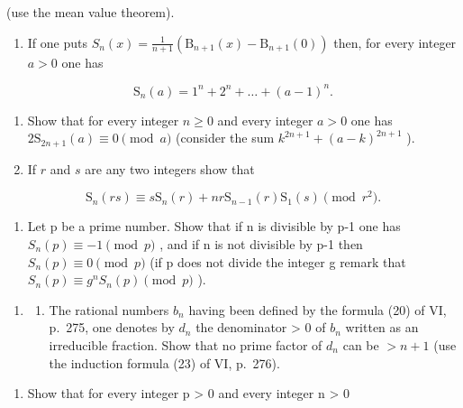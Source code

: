 (use the mean value theorem).

\begin{enumerate}
\def\labelenumi{\arabic{enumi})}
\setcounter{enumi}{4}
\tightlist
\item
  If one puts \(S_{n}(x) = \frac{1}{n + 1} (\mathrm{B}_{n + 1}(x) - \mathrm{B}_{n + 1}(0))\) then, for every integer \(a > 0\) one has
\end{enumerate}

\[
\mathrm{S} _ {n} (a) = 1 ^ {n} + 2 ^ {n} + \dots + (a - 1) ^ {n}.
\]

\begin{enumerate}
\def\labelenumi{\alph{enumi})}
\item
  Show that for every integer \(n \geqslant 0\) and every integer \(a > 0\) one has \(2\mathrm{S}_{2n + 1}(a) \equiv 0 \pmod{a}\) (consider the sum \(k^{2n + 1} + (a - k)^{2n + 1}\) ).
\item
  If \(r\) and \(s\) are any two integers show that
\end{enumerate}

\[
\mathrm{S} _ {n} (r s) \equiv s \mathrm{S} _ {n} (r) + n r \mathrm{S} _ {n - 1} (r) \mathrm{S} _ {1} (s) \pmod {r ^ {2}}.
\]

\begin{enumerate}
\def\labelenumi{\alph{enumi})}
\setcounter{enumi}{2}
\tightlist
\item
  Let p be a prime number. Show that if n is divisible by p-1 one has \(S_{n}(p) \equiv -1 \pmod{p}\) , and if n is not divisible by p-1 then \(S_{n}(p) \equiv 0 \pmod{p}\) (if p does not divide the integer g remark that \(S_{n}(p) \equiv g^{n}S_{n}(p) \pmod{p}\) ).
\end{enumerate}

\begin{enumerate}
\def\labelenumi{\arabic{enumi})}
\setcounter{enumi}{5}
\tightlist
\item
  \begin{enumerate}
  \def\labelenumii{\alph{enumii})}
  \tightlist
  \item
    The rational numbers \(b_{n}\) having been defined by the formula (20) of VI, p.~275, one denotes by \(d_{n}\) the denominator \textgreater{} 0 of \(b_{n}\) written as an irreducible fraction. Show that no prime factor of \(d_{n}\) can be \(> n + 1\) (use the induction formula (23) of VI, p.~276).
  \end{enumerate}
\end{enumerate}

\begin{enumerate}
\def\labelenumi{\alph{enumi})}
\setcounter{enumi}{1}
\tightlist
\item
  Show that for every integer p \textgreater{} 0 and every integer n \textgreater{} 0
\end{enumerate}

